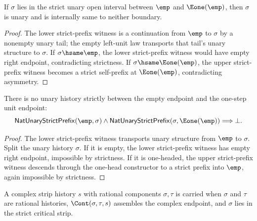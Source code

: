 \begin{theorem}
\label{thm:crit-strip-open-interval-unary-boundary-exclusion}
If $\sigma$ lies in the strict unary open interval between $\emp$ and
$\Eone(\emp)$, then $\sigma$ is unary and is internally same to neither
boundary.
\end{theorem}
\begin{proof}
The lower strict-prefix witness is a continuation from $\emp$ to $\sigma$ by a
nonempty unary tail; the empty left-unit law transports that tail's unary
structure to $\sigma$. If $\sigma\hsame\emp$, the lower strict-prefix witness
would have empty right endpoint, contradicting strictness. If
$\sigma\hsame\Eone(\emp)$, the upper strict-prefix witness becomes a strict
self-prefix at $\Eone(\emp)$, contradicting asymmetry.
\end{proof}

\begin{theorem}
\label{thm:crit-strip-open-interval-empty-unit-absurd}
There is no unary history strictly between the empty endpoint and the one-step
unit endpoint:
$$
\mathsf{NatUnaryStrictPrefix}(\emp,\sigma)\wedge
\mathsf{NatUnaryStrictPrefix}(\sigma,\Eone(\emp))
\Longrightarrow \bot.
$$
\end{theorem}
\begin{proof}
The lower strict-prefix witness transports unary structure from $\emp$ to
$\sigma$. Split the unary history $\sigma$. If it is empty, the lower
strict-prefix witness has empty right endpoint, impossible by strictness. If it
is one-headed, the upper strict-prefix witness descends through the one-head
constructor to a strict prefix into $\emp$, again impossible by strictness.
\end{proof}

\begin{definition}
\label{def:crit-strip-complex-carrier}
A complex strip history $s$ with rational components $\sigma,\tau$ is carried
when $\sigma$ and $\tau$ are rational histories, $\Cont(\sigma,\tau,s)$
assembles the complex endpoint, and $\sigma$ lies in the strict critical
strip.
\end{definition}

